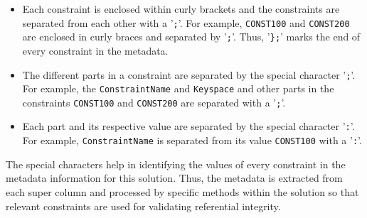 		\begin{itemize}
			\item Each constraint is enclosed within curly brackets and the
			constraints are separated from each other with a
			'\texttt{;}'.  For example,  \texttt{CONST100} and \texttt{CONST200} are
			enclosed in curly braces and separated by '\texttt{;}'. 
			Thus,  '\texttt{\};}' marks the end of every constraint in the metadata. 
		
		
			\item The different parts in a constraint are separated by the special character
			'\texttt{;}'.  For example,  the \texttt{ConstraintName} and \texttt{Keyspace}
			and other parts in the constraints \texttt{CONST100} and \texttt{CONST200} are
			separated with a '\texttt{;}'.
			 
			 
			\item Each part and its respective value are separated by the special
			character '\texttt{:}'.  For example,  \texttt{ConstraintName} is separated from
			its value \texttt{CONST100} with a '\texttt{:}'.  
			
		\end{itemize}

The special characters help in identifying the values of every constraint in the
metadata information for this solution. Thus, the metadata is extracted from
each super column and processed by specific methods within the solution so that
relevant constraints are used for validating referential integrity.  


